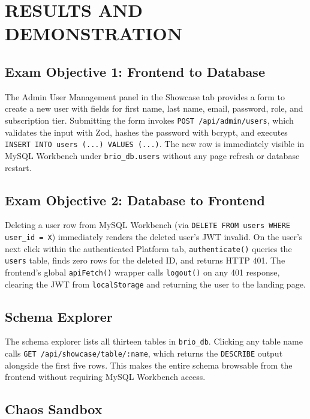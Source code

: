 \documentclass[12pt,a4paper]{article}
\begin{document}
\section{RESULTS AND DEMONSTRATION}

\subsection{Exam Objective 1: Frontend to Database}

The Admin User Management panel in the Showcase tab provides a form to create a new user with
fields for first name, last name, email, password, role, and subscription tier. Submitting the
form invokes \texttt{POST /api/admin/users}, which validates the input with Zod, hashes the
password with bcrypt, and executes \texttt{INSERT INTO users (...) VALUES (...)}. The new row
is immediately visible in MySQL Workbench under \texttt{brio\_db.users} without any page
refresh or database restart.

\subsection{Exam Objective 2: Database to Frontend}

Deleting a user row from MySQL Workbench (via \texttt{DELETE FROM users WHERE user\_id = X})
immediately renders the deleted user's JWT invalid. On the user's next click within the
authenticated Platform tab, \texttt{authenticate()} queries the \texttt{users} table, finds
zero rows for the deleted ID, and returns HTTP 401. The frontend's global \texttt{apiFetch()}
wrapper calls \texttt{logout()} on any 401 response, clearing the JWT from
\texttt{localStorage} and returning the user to the landing page.

\subsection{Schema Explorer}

The schema explorer lists all thirteen tables in \texttt{brio\_db}. Clicking any table name
calls \texttt{GET /api/showcase/table/:name}, which returns the \texttt{DESCRIBE} output
alongside the first five rows. This makes the entire schema browsable from the frontend without
requiring MySQL Workbench access.

\subsection{Chaos Sandbox}
\end{document}

